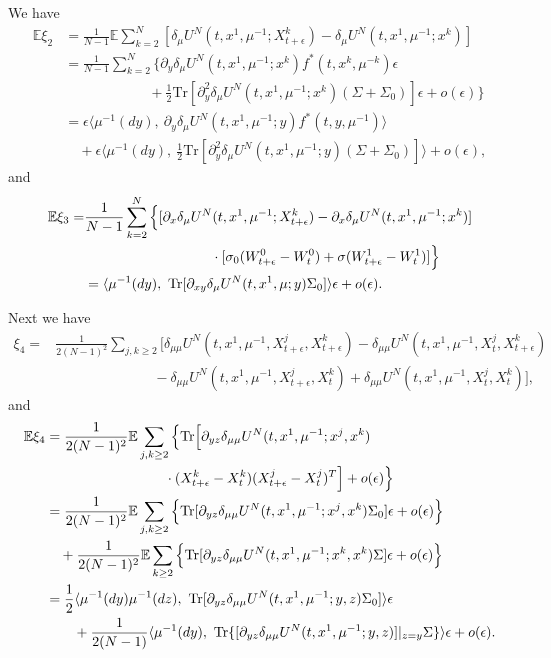 \documentclass{amsart}
\theoremstyle{definition}
\theoremstyle{remark}
\def\EE{{\mathbb E}}
\numberwithin{equation}{section}
\begin{document}
We have
\begin{align*}
\EE\xi_2 &=\frac{1}{N-1}\EE\sum_{k=2}^N [\delta_\mu U^N(t, x^1, \mu^{-1}; X^k_{t+\epsilon}) -\delta_\mu U^N(t, x^1, \mu^{-1}; x^k) ]\\
&=\frac{1}{N-1}\sum_{k=2}^N \Big\{\partial_y \delta_\mu U^N(t, x^1, \mu^{-1}; x^k)
f^*(t,x^k, \mu^{-k}) \epsilon\\
&\qquad\qquad\qquad + \frac12 \mbox{Tr} [\partial_y^2 \delta_\mu U^N(t, x^1, \mu^{-1}; x^k) (\Sigma+\Sigma_0)]\epsilon +o(\epsilon)\Big\}\\
&= \epsilon  \langle  \mu^{-1}(dy), \  \partial_y \delta_\mu U^N(t, x^1, \mu^{-1}; y)
f^*(t,y, \mu^{-1})    \rangle\\
&  \quad  +\epsilon  \langle\mu^{-1}(dy) ,\   \frac12 \mbox{Tr} [\partial_y^2 \delta_\mu U^N(t, x^1, \mu^{-1}; y) (\Sigma+\Sigma_0)]  \rangle +o(\epsilon)  ,
\end{align*}
and
\begin{align*}
\EE\xi_3=& \frac{1}{N-1} \sum_{k=2}^N\Big\{[ \partial_x\delta_\mu  U^N(t, x^1, \mu^{-1}; X^k_{t+\epsilon}) - \partial_x\delta_\mu  U^N(t, x^1, \mu^{-1}; x^k) ] \\
 & \hskip 3.2cm  \cdot[\sigma_0 (W_{t+\epsilon }^0-W_t^0)+\sigma(W^1_{t+\epsilon}-W^1_t)]\Big\}      \\
& =\langle \mu^{-1}(dy),\ \mbox{Tr} [\partial_{xy}\delta_\mu U^N(t,x^1, \mu; y)\Sigma_0 ]\rangle \epsilon +o(\epsilon).
\end{align*}

Next we have
\begin{align*}
\xi_4=&  \frac{1}{2(N-1)^2} \sum_{j,k\ge 2}\Big[ \delta_{\mu\mu}U^N(t, x^1, \mu^{-1}, X_{t+\epsilon}^j, X_{t+\epsilon}^k)- \delta_{\mu\mu}U^N(t, x^1, \mu^{-1}, X_{t}^j, X_{t+\epsilon}^k)\\
&\qquad\qquad\qquad\quad - \delta_{\mu\mu}U^N(t, x^1, \mu^{-1}, X_{t+\epsilon}^j, X_{t}^k)+\delta_{\mu\mu}U^N(t, x^1, \mu^{-1}, X_{t}^j, X_{t}^k)\Big],
\end{align*}
and
\begin{align*}
\EE \xi_4&= \frac{1}{2(N-1)^2}\EE\sum_{j,k\ge 2}\Big\{ \mbox{Tr}\Big[\partial_{yz} \delta_{\mu\mu} U^N(t, x^1, \mu^{-1};x^j,x^k)\\
&\hskip 3cm\cdot (X_{t+\epsilon}^k-X_t^k)(X_{t+\epsilon}^j-X_t^j)^T\Big] +o(\epsilon)\Big\}  \\
&= \frac{1}{2(N-1)^2}\EE\sum_{j,k\ge 2}\Big\{ \mbox{Tr}[\partial_{yz} \delta_{\mu\mu} U^N(t, x^1, \mu^{-1};x^j,x^k) \Sigma_0]\epsilon +o(\epsilon)\Big\} \\
&\quad + \frac{1}{2(N-1)^2}\EE\sum_{k\ge 2}\Big\{ \mbox{Tr}[\partial_{yz} \delta_{\mu\mu} U^N(t, x^1, \mu^{-1};x^k,x^k) \Sigma] \epsilon +o(\epsilon)\Big\}\\
& = \frac12\langle\mu^{-1}(dy) \mu^{-1}(dz), \    \mbox{Tr[}\partial_{yz} \delta_{\mu\mu} U^N(t, x^1, \mu^{-1};y,z) \Sigma_0  ]\rangle\epsilon \\
&\qquad  +  \frac{1}{2(N-1)}\langle\mu^{-1}(dy) , \    \mbox{Tr}\{[\partial_{yz} \delta_{\mu\mu} U^N(t, x^1, \mu^{-1};y,z)]|_{z=y} \Sigma \} \rangle\epsilon
+o(\epsilon).
\end{align*}
\end{document}
